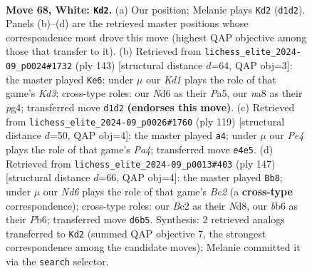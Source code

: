 \documentclass[11pt]{article}
\begin{document}
\clearpage

\begin{figure}[p]\centering
\begin{subfigure}{0.46\textwidth}\centering
\resizebox{\linewidth}{!}{%
\newchessgame
\chessboard[
  setfen={n4k2/3n4/1b1N4/p7/P2pP3/1P5p/2B1P3/3K4 w - - 2 68},
  showmover=false,
  pgfstyle=straightmove, color=movearrow, markmove={d1-d2}
]}
\caption{}
\end{subfigure}\hfill
\begin{subfigure}{0.46\textwidth}\centering
\resizebox{\linewidth}{!}{%
\newchessgame
\chessboard[
  setfen={3b4/8/1p1k4/pP2p1p1/P1K1P1P1/4N3/8/8 b - - 63 72},
  showmover=false,
  pgfstyle=straightmove, color=movearrow, markmove={d6-e6}
]}
\caption{}
\end{subfigure}
\\[4pt]
\begin{subfigure}{0.46\textwidth}\centering
\resizebox{\linewidth}{!}{%
\newchessgame
\chessboard[
  setfen={4N3/8/1b3Bp1/ppk4p/7P/1P6/4K3/8 b - - 4 60},
  showmover=false,
  pgfstyle=straightmove, color=movearrow, markmove={a5-a4}
]}
\caption{}
\end{subfigure}\hfill
\begin{subfigure}{0.46\textwidth}\centering
\resizebox{\linewidth}{!}{%
\newchessgame
\chessboard[
  setfen={3n4/2b5/ppk5/2p3N1/P1P1K3/1P6/3B4/8 b - - 3 74},
  showmover=false,
  pgfstyle=straightmove, color=movearrow, markmove={c7-b8}
]}
\caption{}
\end{subfigure}
\caption{\textbf{Move 68, White: \texttt{Kd2}.} (a) Our position; Melanie plays \texttt{Kd2} (\texttt{d1d2}). Panels (b)--(d) are the retrieved master positions whose correspondence most drove this move (highest QAP objective among those that transfer to it). (b) Retrieved from \texttt{lichess\_elite\_2024-09\_p0024\#1732} (ply 143) [structural distance $d$=64, QAP obj=3]: the master played \texttt{Ke6}; under $\mu$ our \emph{Kd1} plays the role of that game's \emph{Kd3}; cross-type roles: our \emph{N}d6 as their \emph{P}a5, our \emph{n}a8 as their \emph{p}g4; transferred move \texttt{d1d2} \textbf{(endorses this move)}. (c) Retrieved from \texttt{lichess\_elite\_2024-09\_p0026\#1760} (ply 119) [structural distance $d$=50, QAP obj=4]: the master played \texttt{a4}; under $\mu$ our \emph{Pe4} plays the role of that game's \emph{Pa4}; transferred move \texttt{e4e5}. (d) Retrieved from \texttt{lichess\_elite\_2024-09\_p0013\#403} (ply 147) [structural distance $d$=66, QAP obj=4]: the master played \texttt{Bb8}; under $\mu$ our \emph{Nd6} plays the role of that game's \emph{Bc2} (a \textbf{cross-type} correspondence); cross-type roles: our \emph{B}c2 as their \emph{N}d8, our \emph{b}b6 as their \emph{P}b6; transferred move \texttt{d6b5}. Synthesis: 2 retrieved analogs transferred to \texttt{Kd2} (summed QAP objective 7, the strongest correspondence among the candidate moves); Melanie committed it via the \texttt{search} selector.}
\label{fig:thought-m134}
\end{figure}
\end{document}
